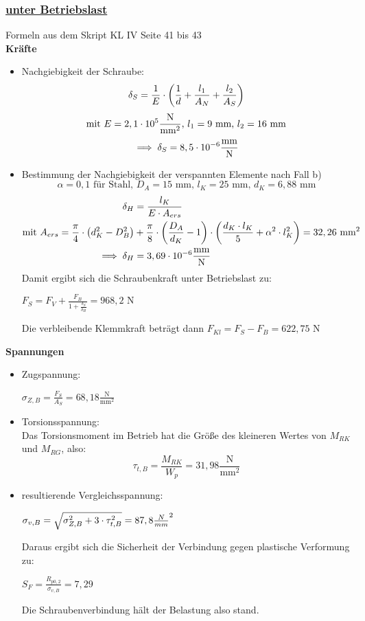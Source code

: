 \subsubsection{\underline{unter Betriebslast}}
Formeln aus dem Skript KL IV  Seite 41 bis 43 \\
\textbf{Kräfte}
\begin{itemize}
	\item Nachgiebigkeit der Schraube:
	\[\delta_S = \frac{1}{E}\cdot \left(\frac{1}{d}+\frac{l_1}{A_N}+\frac{l_2}{A_S}\right)\]
	\[\text{mit } E = 2,1\cdot 10^5 \frac{\text{N}}{\text{mm}^2} \text{, } l_1 = 9 \text{ mm, } l_2 = 16 \text{ mm}\]
	\[\implies \delta_S = 8,5\cdot 10^{-6} \frac{\text{mm}}{\text{N}}\]
	\item Bestimmung der Nachgiebigkeit der verspannten Elemente nach Fall b)
	\[\alpha = 0,1 \text{ für Stahl, } D_A = 15 \text{ mm, } l_K = 25 \text{ mm, }  d_K = 6,88 \text{ mm}\]
	\begin{align*}
	\delta_H &= \frac{l_K}{E\cdot A_{ers}}\\
	\text{mit } A_{ers} = \frac{\pi}{4}\cdot \left(d_K^2 -D_B^2\right) &+ \frac{\pi}{8}\cdot\left(\frac{D_A}{d_K}-1\right)\cdot\left(\frac{d_K\cdot l_K}{5}+ \alpha^2\cdot l_K^2\right) = 32,26 \text{ mm}^2\\
	\implies \delta_H &= 3,69\cdot 10^{-6} \frac{\text{mm}}{\text{N}}
	\end{align*}
	Damit ergibt sich die Schraubenkraft unter Betriebslast zu: \\
	\begin{center}
		$F_S = F_V+ \frac{F_B}{1+\frac{\delta_S}{\delta_H}} = 968,2 \text{ N}$
	\end{center}
	Die verbleibende Klemmkraft beträgt dann $ F_{Kl} = F_S-F_B = 622,75 \text{ N}$
\end{itemize}
\newpage
\textbf{Spannungen}
\begin{itemize}
	\item Zugspannung: \\
	\begin{center}
		$\sigma_{Z,B} = \frac{F_S}{A_S} = 68,18 \frac{\text{N}}{\text{mm}^2}$
	\end{center}
	\item Torsionsspannung:\\
	\vspace{0.3cm}
	Das Torsionsmoment im Betrieb hat die Größe des kleineren Wertes von $M_{RK}$ und $M_{RG}$, also: 
	\[\tau_{t,B} = \frac{M_{RK}}{W_p} = 31,98 \frac{\text{N}}{\text{mm}^2}\]
	\item resultierende Vergleichsspannung: \\
	 \begin{center}
	 	$\sigma_{v,B} = \sqrt{\sigma_{Z,B}^2+3\cdot \tau_{t,B}^2} = 87,8 \frac{N}{mm}^2$
	 \end{center}
	\vspace{.5cm}
	Daraus ergibt sich die Sicherheit der Verbindung gegen plastische Verformung zu: 
	\begin{center}
		$S_F = \frac{R_{p0,2}}{\sigma_{v,B}} = 7,29$
	\end{center}
	Die Schraubenverbindung hält der Belastung also stand.
\end{itemize}